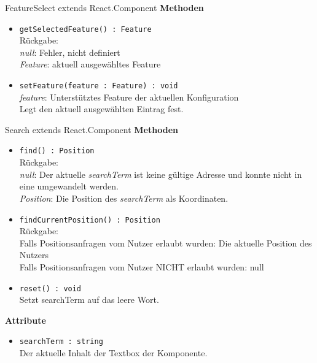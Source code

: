 \begin{Class}{FeatureSelect extends React.Component}
    \textbf{Methoden}
    \begin{itemize}
        \item \texttt{getSelectedFeature() : Feature}
        \\ Rückgabe:
        \\ \emph{null}: Fehler, nicht definiert
        \\ \emph{Feature}: aktuell ausgewähltes Feature
        \item \texttt{setFeature(feature : Feature) : void}
        \\ \emph{feature}: Unterstütztes Feature der aktuellen Konfiguration
        \\ Legt den aktuell ausgewählten Eintrag fest.
    \end{itemize}
\end{Class}

\begin{Class}{Search extends React.Component}
    \textbf{Methoden}
    \begin{itemize}
        \item \texttt{find() : Position}
        \\ Rückgabe:
        \\ \emph{null}: Der aktuelle \emph{searchTerm} ist keine gültige Adresse und konnte nicht in eine umgewandelt werden.
        \\ \emph{Position}: Die Position des \emph{searchTerm} als Koordinaten.
        \item \texttt{findCurrentPosition() : Position}
        \\ Rückgabe:
        \\ Falls Positionsanfragen vom Nutzer erlaubt wurden: Die aktuelle Position des Nutzers
        \\ Falls Positionsanfragen vom Nutzer NICHT erlaubt wurden: null
        \item \texttt{reset() : void}
        \\ Setzt searchTerm auf das leere Wort.
    \end{itemize}
    \textbf{Attribute}
    \begin{itemize}
        \item \texttt{searchTerm : string}
        \\ Der aktuelle Inhalt der Textbox der Komponente.
    \end{itemize}
\end{Class}

